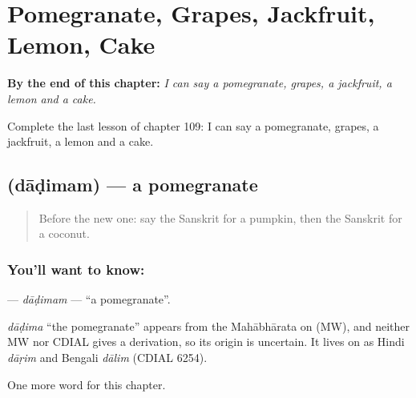 
\chapter{Pomegranate, Grapes, Jackfruit, Lemon, Cake}
\label{ch:sa-pomegranate-grapes-jackfruit-lemon-cake}

\begin{chapteropening}
\textbf{By the end of this chapter:} \emph{I can say a pomegranate, grapes, a jackfruit, a lemon and a cake.}

Complete the last lesson of chapter 109: I can say a pomegranate, grapes, a jackfruit, a lemon and a cake.
\end{chapteropening}

\section[\texorpdfstring{\sk{दाडिमम्} (dāḍimam)}{दाडिमम् (dāḍimam)}]{ (dāḍimam) — a pomegranate}

\label{lesson:SA-C109-dadimam}



\begin{quote}
Before the new one: say the Sanskrit for a pumpkin, then the Sanskrit for a coconut.
\end{quote}

\subsection*{You'll want to know: }
\textbf{} — \emph{dāḍimam} — \textquotedblleft{}a pomegranate\textquotedblright{}.

\begin{cousinweb}
\emph{dāḍima} \textquotedblleft{}the pomegranate\textquotedblright{} appears from the Mahābhārata on (MW), and neither MW nor CDIAL gives a derivation, so its origin is uncertain. It lives on as Hindi \emph{dāṛim} and Bengali \emph{dālim} (CDIAL 6254).
\end{cousinweb}

\begin{grammarlens}[title={What you've built}]
One more word for this chapter.
\end{grammarlens}


